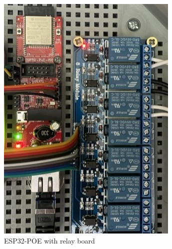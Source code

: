 \begin{figure}[H]
    \centering
    \begin{subfigure}{.5\textwidth}
        \raggedright
        \includegraphics[width=.975\linewidth]{img/pool-controler.JPEG}
        \caption{ESP32-POE with relay board}
    \end{subfigure}%
    \begin{subfigure}{.5\textwidth}
        \raggedleft

\end{subfigure}
\end{figure}
